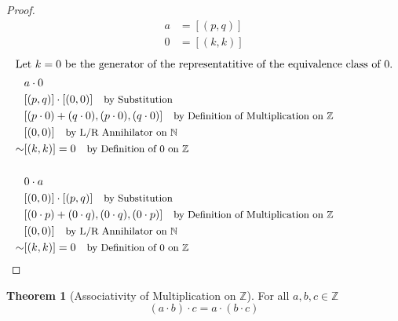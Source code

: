 \documentclass[12pt]{article}
\newcommand{\stext}[1]{\quad\text{\small #1}}
\theoremstyle{definition}
\newtheorem{theorem}{Theorem}
\begin{document}
\begin{proof}
    \begin{align*}
        a &= [(p, q)] \\ 
        0 &= [(k, k)]
    \end{align*}
    \begin{align*}
        \intertext{Let $k = 0$ be the generator of the representatitive of the equivalence class of $0$.}
        & a \cdot 0 \\ 
        & [(p, q)] \cdot [(0, 0)] \stext{by Substitution}\\ 
        & [(p \cdot 0) + (q \cdot 0), (p \cdot 0), (q \cdot 0)] \stext{by Definition of Multiplication on $\mathbb{Z}$}\\ 
        & [(0, 0)] \stext{by L/R Annihilator on $\mathbb{N}$}\\
        \sim & [(k, k)] = 0 \stext{by Definition of $0$ on $\mathbb{Z}$}\\ \\ 
        & 0 \cdot a \\
        & [(0, 0)] \cdot [(p, q)] \stext{by Substitution}\\ 
        & [(0 \cdot p) + (0 \cdot q), (0 \cdot q), (0 \cdot p)] \stext{by Definition of Multiplication on $\mathbb{Z}$}\\ 
        & [(0, 0)] \stext{by L/R Annihilator on $\mathbb{N}$} \\
        \sim & [(k, k)] = 0 \stext{by Definition of $0$ on $\mathbb{Z}$}
    \end{align*}
\end{proof}
\begin{theorem}[Associativity of Multiplication on $\mathbb{Z}$]
    For all $a, b, c \in \mathbb{Z}$
    \begin{equation*}
        (a \cdot b) \cdot c = a \cdot (b \cdot c)
    \end{equation*}
\end{theorem}
\end{document}
